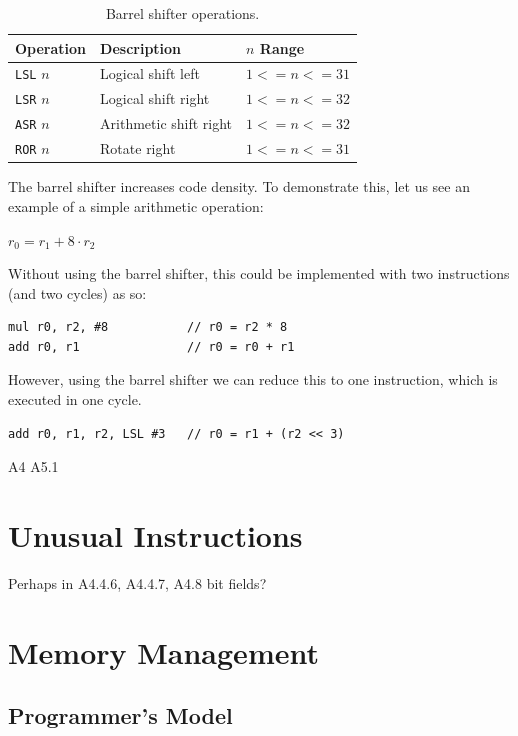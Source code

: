 \documentclass[oneside,a4paper]{report}
\begin{document}
\begin{table}[htb]
	\centering
	\begin{tabular}{lll}
		\toprule
		Operation		&	Description				&	$n$ Range		\\
		\midrule
		\texttt{LSL}	$n$			&	Logical shift left		&	$1 <= n <= 31$	\\
		\texttt{LSR}	$n$			&	Logical shift right		&	$1 <= n <= 32$	\\
		\texttt{ASR}	$n$			&	Arithmetic shift right	&	$1 <= n <= 32$	\\
		\texttt{ROR}	$n$			&	Rotate right			&	$1 <= n <= 31$	\\
		\bottomrule
	\end{tabular}
	\caption{Barrel shifter operations. \cite[p. A8-10]{ARMRef}}
	\label{tab:shifts}
\end{table}

The barrel shifter increases code density. To demonstrate this, let us see an example of a simple arithmetic operation:

$r_0 = r_1 + 8\cdot{}r_2$

Without using the barrel shifter, this could be implemented with two instructions (and two cycles) as so:

\begin{singlespacing}
\begin{lstlisting}[language={[ARM]Assembler}]
mul r0, r2, #8           // r0 = r2 * 8
add r0, r1               // r0 = r0 + r1
\end{lstlisting}
\end{singlespacing}

However, using the barrel shifter we can reduce this to one instruction, which is executed in one cycle.

\begin{lstlisting}[language={[ARM]Assembler}]
add r0, r1, r2, LSL #3   // r0 = r1 + (r2 << 3)
\end{lstlisting}

A4
A5.1

\chapter{Unusual Instructions}
Perhaps in A4.4.6, A4.4.7, A4.8
bit fields?

\chapter{Memory Management}

\section{Programmer's Model}
\end{document}

